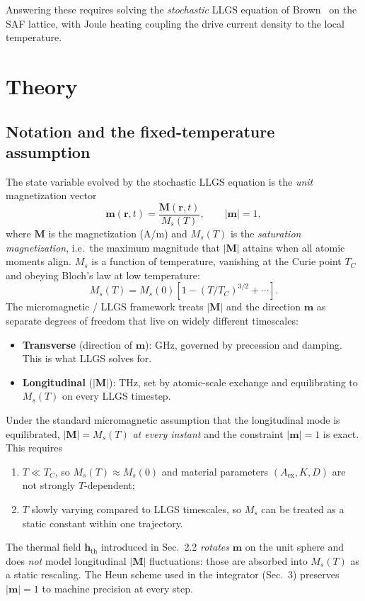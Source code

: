 \documentclass[11pt,a4paper]{article}
\newcommand{\mb}[1]{\mathbf{#1}}
\newcommand{\hth}{\mb{h}_{\text{th}}}
\newcommand{\Aex}{A_{\text{ex}}}
\begin{document}
Answering these requires solving the \emph{stochastic} LLGS equation
of Brown~\cite{brown1963} on the SAF lattice, with Joule heating
coupling the drive current density to the local temperature.

\section{Theory}

\subsection{Notation and the fixed-temperature assumption}
\label{sec:notation_fixed_T}

The state variable evolved by the stochastic LLGS equation is the
\emph{unit} magnetization vector
%
\begin{equation}
\mb{m}(\mb{r}, t) = \frac{\mb{M}(\mb{r}, t)}{M_s(T)},
\qquad |\mb{m}| = 1,
\end{equation}
%
where $\mb{M}$ is the magnetization (A/m) and $M_s(T)$ is the
\emph{saturation magnetization}, i.e.\ the maximum magnitude that
$|\mb{M}|$ attains when all atomic moments align. $M_s$ is a function
of temperature, vanishing at the Curie point $T_C$ and obeying Bloch's
law at low temperature:
%
\begin{equation}\label{eq:bloch}
M_s(T) = M_s(0) \left[1 - (T/T_C)^{3/2} + \cdots \right].
\end{equation}
%
The micromagnetic / LLGS framework treats $|\mb{M}|$ and the direction
$\mb{m}$ as separate degrees of freedom that live on widely different
timescales:
%
\begin{itemize}[leftmargin=2em, nosep]
    \item \textbf{Transverse} (direction of $\mb{m}$): GHz, governed
        by precession and damping. This is what LLGS solves for.
    \item \textbf{Longitudinal} ($|\mb{M}|$): THz, set by atomic-scale
        exchange and equilibrating to $M_s(T)$ on every LLGS timestep.
\end{itemize}
%
Under the standard micromagnetic assumption that the longitudinal mode
is equilibrated, $|\mb{M}| = M_s(T)$ \emph{at every instant} and the
constraint $|\mb{m}| = 1$ is exact. This requires
%
\begin{enumerate}[leftmargin=2em, nosep]
    \item $T \ll T_C$, so $M_s(T) \approx M_s(0)$ and material
        parameters $(\Aex, K, D)$ are not strongly $T$-dependent;
    \item $T$ slowly varying compared to LLGS timescales, so $M_s$ can
        be treated as a static constant within one trajectory.
\end{enumerate}
%
The thermal field $\hth$ introduced in Sec.~2.2 \emph{rotates} $\mb{m}$
on the unit sphere and does \emph{not} model longitudinal $|\mb{M}|$
fluctuations: those are absorbed into $M_s(T)$ as a static rescaling.
The Heun scheme used in the integrator (Sec.~3) preserves
$|\mb{m}|=1$ to machine precision at every step.
%
\end{document}
